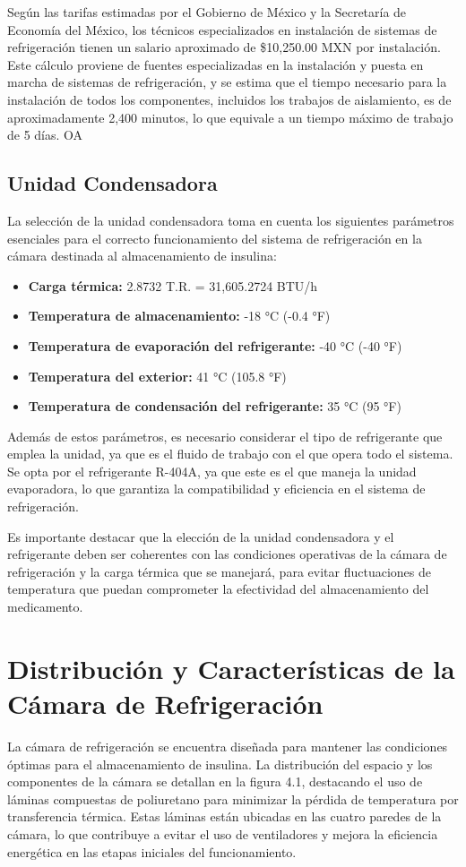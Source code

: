  
 Según las tarifas estimadas por el Gobierno de México y la Secretaría de Economía del México, los técnicos especializados en instalación de sistemas de refrigeración tienen un salario aproximado de \$10,250.00 MXN por instalación. Este cálculo proviene de fuentes especializadas en la instalación y puesta en marcha de sistemas de refrigeración, y se estima que el tiempo necesario para la instalación de todos los componentes, incluidos los trabajos de aislamiento, es de aproximadamente 2,400 minutos, lo que equivale a un tiempo máximo de trabajo de 5 días.
OA 
 \subsection{Unidad Condensadora}
 La selección de la unidad condensadora toma en cuenta los siguientes parámetros esenciales para el correcto funcionamiento del sistema de refrigeración en la cámara destinada al almacenamiento de insulina:
 
 \begin{itemize}
 	\item \textbf{Carga térmica:} 2.8732 T.R. = 31,605.2724 BTU/h
 	\item \textbf{Temperatura de almacenamiento:} -18 °C (-0.4 °F)
 	\item \textbf{Temperatura de evaporación del refrigerante:} -40 °C (-40 °F)
 	\item \textbf{Temperatura del exterior:} 41 °C (105.8 °F)
 	\item \textbf{Temperatura de condensación del refrigerante:} 35 °C (95 °F)
 \end{itemize}
 
 Además de estos parámetros, es necesario considerar el tipo de refrigerante que emplea la unidad, ya que es el fluido de trabajo con el que opera todo el sistema. Se opta por el refrigerante R-404A, ya que este es el que maneja la unidad evaporadora, lo que garantiza la compatibilidad y eficiencia en el sistema de refrigeración.
 
 Es importante destacar que la elección de la unidad condensadora y el refrigerante deben ser coherentes con las condiciones operativas de la cámara de refrigeración y la carga térmica que se manejará, para evitar fluctuaciones de temperatura que puedan comprometer la efectividad del almacenamiento del medicamento.
 
 \section{Distribución y Características de la Cámara de Refrigeración}
 La cámara de refrigeración se encuentra diseñada para mantener las condiciones óptimas para el almacenamiento de insulina. La distribución del espacio y los componentes de la cámara se detallan en la figura 4.1, destacando el uso de láminas compuestas de poliuretano para minimizar la pérdida de temperatura por transferencia térmica. Estas láminas están ubicadas en las cuatro paredes de la cámara, lo que contribuye a evitar el uso de ventiladores y mejora la eficiencia energética en las etapas iniciales del funcionamiento.
 
